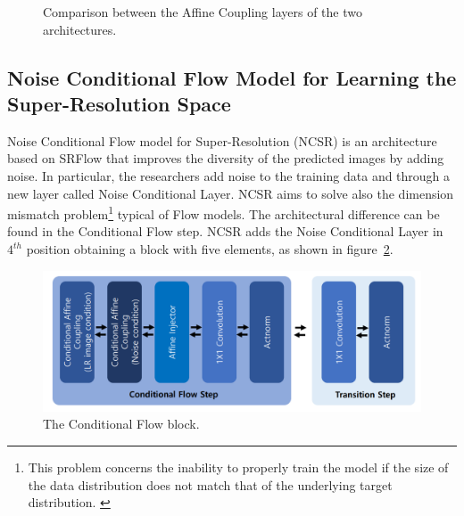 \documentclass{article}
\begin{document}
    \begin{figure}[h]
        \centering
        \qquad
        \caption{Comparison between the Affine Coupling layers of the two architectures.}
        \label{fig:dablock}
    \end{figure}


\subsection{Noise Conditional Flow Model for Learning the Super-Resolution Space}
Noise Conditional Flow model for Super-Resolution (NCSR) \cite{ncsr} is an architecture based on SRFlow that improves the diversity of the predicted images by adding noise. In particular, the researchers add noise to the training data and through a new layer called Noise Conditional Layer. NCSR aims to solve also the dimension mismatch problem\footnote{This problem concerns the inability to properly train the model if the size of the data distribution does not match that of the underlying target distribution. \cite{SoftFlow}} typical of Flow models. The architectural difference can be found in the Conditional Flow step. NCSR adds the Noise Conditional Layer in $4^{th}$ position obtaining a block with five elements, as shown in figure~\ref{img:nblock}.

\begin{figure}[h]
    \centering
    \includegraphics[scale=.35]{nblock}
    \caption{The Conditional Flow block.}
    \label{img:nblock}
\end{figure}
\end{document}
